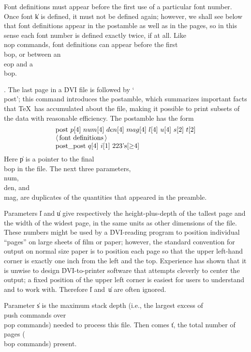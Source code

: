 Font definitions must appear before the first use of a particular font number.
Once font \|k is defined, it must not be defined again; however, we
shall see below that font definitions appear in the postamble as well as
in the pages, so in this sense each font number is defined exactly twice,
if at all. Like \\{nop} commands, font definitions can
appear before the first \\{bop}, or between an \\{eop} and a \\{bop}.

\fi

. The last page in a \.{DVI} file is followed by `\\{post}'; this command
introduces the postamble, which summarizes important facts that \TeX\ has
accumulated about the file, making it possible to print subsets of the data
with reasonable efficiency. The postamble has the form
$$\vbox{\halign{\hbox{#\hfil}\cr
\\{post} $\|p[4]$ $\\{num}[4]$ $\\{den}[4]$ $\\{mag}[4]$ $\|l[4]$ $\|u[4]$ $%
\|s[2]$ $\|t[2]$\cr
$\langle\,$font definitions$\,\rangle$\cr
\\{post\_post} $\|q[4]$ $\|i[1]$ 223's$[{\G}4]$\cr}}$$
Here \|p is a pointer to the final \\{bop} in the file. The next three
parameters, \\{num}, \\{den}, and \\{mag}, are duplicates of the quantities
that
appeared in the preamble.

Parameters \|l and \|u give respectively the height-plus-depth of the tallest
page and the width of the widest page, in the same units as other dimensions
of the file. These numbers might be used by a \.{DVI}-reading program to
position individual ``pages'' on large sheets of film or paper; however,
the standard convention for output on normal size paper is to position each
page so that the upper left-hand corner is exactly one inch from the left
and the top. Experience has shown that it is unwise to design %
\.{DVI}-to-printer
software that attempts cleverly to center the output; a fixed position of
the upper left corner is easiest for users to understand and to work with.
Therefore \|l and~\|u are often ignored.

Parameter \|s is the maximum stack depth (i.e., the largest excess of
\\{push} commands over \\{pop} commands) needed to process this file. Then
comes \|t, the total number of pages (\\{bop} commands) present.

